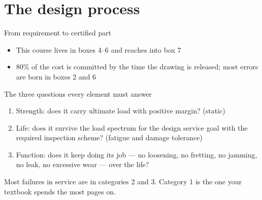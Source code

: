 \documentclass[aspectratio=169,10pt]{beamer}
\begin{document}
\section{The design process}

\begin{frame}{From requirement to certified part}
\vspace{6pt}
\begin{itemize}
  \item This course lives in boxes 4--6 and reaches into box 7
  \item 80\% of the cost is committed by the time the drawing is released; most errors are born in boxes 2 and 6
\end{itemize}
\end{frame}

\begin{frame}{The three questions every element must answer}
\begin{enumerate}
  \item \alert{Strength}: does it carry ultimate load with positive margin? (static)
  \item \alert{Life}: does it survive the load spectrum for the design service goal with the required inspection scheme? (fatigue and damage tolerance)
  \item \alert{Function}: does it keep doing its job --- no loosening, no fretting, no jamming, no leak, no excessive wear --- over the life?
\end{enumerate}
\begin{block}{}
Most failures in service are in categories 2 and 3. Category 1 is the one your textbook spends the most pages on.
\end{block}
\end{frame}
\end{document}
